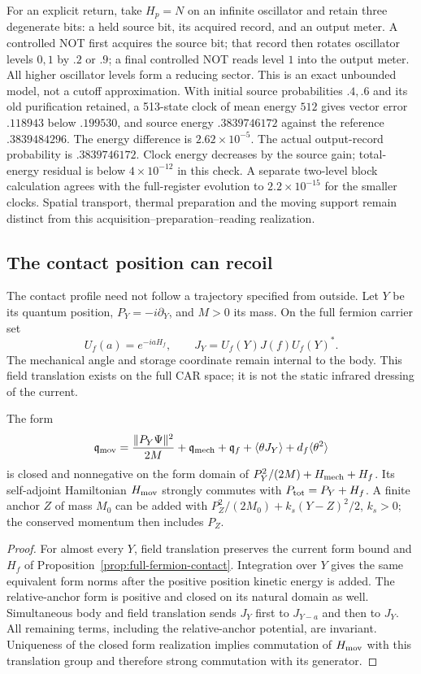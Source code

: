 For an explicit return, take $H_p=N$ on an infinite oscillator and
retain three degenerate bits: a held source bit, its acquired record,
and an output meter. A controlled NOT first acquires the source bit;
that record then rotates oscillator levels $0,1$ by $.2$ or $.9$;
a final controlled NOT reads level $1$ into the output meter.
All higher oscillator levels form a reducing sector. This is an exact
unbounded model, not a cutoff approximation. With initial source
probabilities $.4,.6$ and its old purification retained, a 513-state
clock of mean energy $512$ gives vector error $.118943$ below
$.199530$, and source energy $.3839746172$ against the reference
$.3839484296$. The energy difference is $2.62\times10^{-5}$.
The actual output-record probability is $.3839746172$.
Clock energy decreases by the source gain; total-energy residual is
below $4\times10^{-12}$ in this check. A separate two-level block
calculation agrees with the full-register evolution to
$2.2\times10^{-15}$ for the smaller clocks. Spatial transport,
thermal preparation and the moving support remain distinct from
this acquisition--preparation--reading realization.

\subsection{The contact position can recoil}
\label{sec:moving-quantum-contact}

The contact profile need not follow a trajectory specified from outside.
Let $Y$ be its quantum position, $P_Y=-i\partial_Y$, and $M>0$ its
mass. On the full fermion carrier set
\[
 U_f(a)=e^{-iaH_f},\qquad J_Y=U_f(Y)J(f)U_f(Y)^*.
\]
The mechanical angle and storage coordinate remain internal to the
body. This field translation exists on the full CAR space; it is
not the static infrared dressing of the current.

\begin{proposition}
\label{prop:moving-contact}
The form
\[
 \mathfrak q_{\rm mov}=\frac{\|P_Y\Psi\|^2}{2M}
 +\mathfrak q_{\rm mech}+\mathfrak q_f
 +\langle\theta J_Y\rangle+d_f\langle\theta^2\rangle
\]
is closed and nonnegative on the form domain of
$P_Y^2/(2M)+H_{\rm mech}+H_f$. Its self-adjoint Hamiltonian
$H_{\rm mov}$ strongly commutes with $P_{\rm tot}=P_Y+H_f$.
A finite anchor $Z$ of mass $M_0$ can be added with
$P_Z^2/(2M_0)+k_s(Y-Z)^2/2$, $k_s>0$; the conserved momentum
then includes $P_Z$.
\end{proposition}
\begin{proof}
For almost every $Y$, field translation preserves the current form
bound and $H_f$ of Proposition~\ref{prop:full-fermion-contact}.
Integration over $Y$ gives the same equivalent form norms after the
positive position kinetic energy is added. The relative-anchor form
is positive and closed on its natural domain as well.
Simultaneous body and field translation sends $J_Y$ first to
$J_{Y-a}$ and then to $J_Y$. All remaining terms, including the
relative-anchor potential, are invariant. Uniqueness of the closed
form realization implies commutation of $H_{\rm mov}$ with this
translation group and therefore strong commutation with its generator.
\end{proof}

